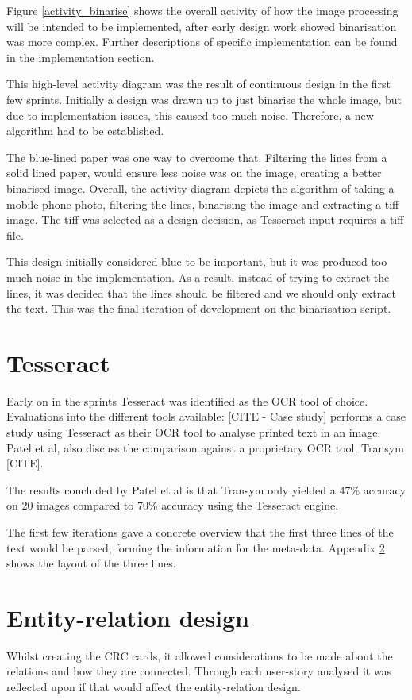 Figure \ref{activity_binarise} shows the overall activity of how the image processing will be intended to be implemented, after early design work showed binarisation was more complex. Further descriptions of specific implementation can be found in the implementation section.

This high-level activity diagram was the result of continuous design in the first few sprints. Initially a design was drawn up to just binarise the whole image, but due to implementation issues, this caused too much noise. Therefore, a new algorithm had to be established.

The blue-lined paper was one way to overcome that. Filtering the lines from a solid lined paper, would ensure less noise was on the image, creating a better binarised image. Overall, the activity diagram depicts the algorithm of taking a mobile phone photo, filtering the lines, binarising the image and extracting a tiff image. The tiff was selected as a design decision, as Tesseract input requires a tiff file.

This design initially considered blue to be important, but it was produced too much noise in the implementation. As a result, instead of trying to extract the lines, it was decided that the lines should be filtered and we should only extract the text. This was the final iteration of development on the binarisation script.

\section{Tesseract}
Early on in the sprints Tesseract was identified as the OCR tool of choice. Evaluations into the different tools available: [CITE - Case study] performs a case study using Tesseract as their OCR tool to analyse printed text in an image. Patel et al, also discuss the comparison against a proprietary OCR tool, Transym [CITE].

The results concluded by Patel et al is that Transym only yielded a 47\% accuracy on 20 images compared to 70\% accuracy using the Tesseract engine.

The first few iterations gave a concrete overview that the first three lines of the text would be parsed, forming the information for the meta-data. Appendix \ref{} shows the layout of the three lines.

\section{Entity-relation design}
Whilst creating the CRC cards, it allowed considerations to be made about the relations and how they are connected. Through each user-story analysed it was reflected upon if that would affect the entity-relation design.

